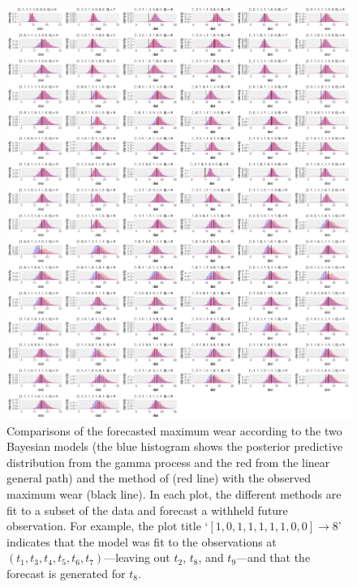 \begin{figure}
  \centering
  \includegraphics[width=\textwidth]{figures/ch-6/test.png}
  \caption{Comparisons of the forecasted maximum wear according to the two Bayesian models (the blue histogram shows the posterior predictive distribution from the gamma process and the red from the linear general path) and the method of \citet{webb_2020} (red line) with the observed maximum wear (black line). In each plot, the different methods are fit to a subset of the data and forecast a withheld future observation. For example, the plot title `$[1, 0, 1, 1, 1, 1, 1, 0, 0] \rightarrow 8$' indicates that the model was fit to the observations at $(t_1, t_3, t_4, t_5, t_6, t_7)$---leaving out $t_2$, $t_8$, and $t_9$---and that the forecast is generated for $t_8$.}
  \label{fig:beltwear-resampling}
\end{figure}

